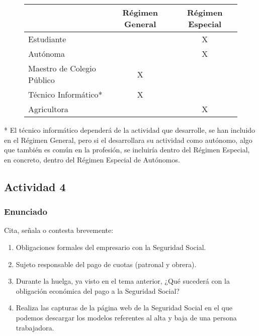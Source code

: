\begin{figure}[ht]

    \vspace{3ex}
    \centering

    \setlength{\tabcolsep}{10pt}
    \renewcommand{\arraystretch}{1.4}

    \begin{tabular}{| l | c | c |}
        \hline
        {} & \textbf{Régimen General} & \textbf{Régimen Especial} \\ \hline
        \centering Estudiante &   & X \\
        \hline
        \centering Autónoma &   & X \\
        \hline
        \centering Maestro de Colegio Público &  X &  \\
        \hline
        \centering Técnico Informático* &  X &  \\
        \hline
        \centering Agricultora &   & X \\
        \hline
    \end{tabular}
\end{figure}

* El técnico informático dependerá de la actividad que desarrolle, se han incluido en el Régimen General, pero si el desarrollara su actividad como autónomo, algo que también es común en la profesión, se incluiría dentro del Régimen Especial, en concreto, dentro del Régimen Especial de Autónomos.

\subsection{Actividad 4}

\subsubsection{Enunciado}
Cita, señala o contesta brevemente:

\begin{enumerate}
    \item Obligaciones formales del empresario con la Seguridad Social.
    \item Sujeto responsable del pago de cuotas (patronal y obrera).
    \item Durante la huelga, ya visto en el tema anterior, ¿Qué sucederá con la obligación económica del pago a la Seguridad Social?
    \item Realiza las capturas de la página web de la Seguridad Social en el que  podemos descargar los modelos referentes al alta y baja de una persona trabajadora.
\end{enumerate}

